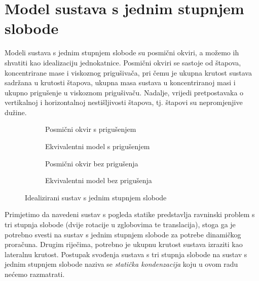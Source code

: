 \section{Model sustava s jednim stupnjem slobode}
Modeli sustava s jednim stupnjem slobode su posmični okviri, a možemo ih shvatiti
kao idealizaciju jednokatnice. Posmični okviri se sastoje od štapova, koncentrirane
mase i viskoznog prigušivača, pri čemu je ukupna krutost sustava sadržana u krutosti
štapova, ukupna masa sustava u koncentriranoj masi i ukupno prigušenje u viskoznom
prigušivaču. Nadalje, vrijedi pretpostavaka o vertikalnoj i horizontalnoj
nestišljivosti štapova, tj. štapovi su nepromjenjive dužine.
\par
\begin{figure}[H]
    \begin{subfigure}[b]{0.5\textwidth}\label{fig:priguseni-sustav-sdf}
        \centering
        
        \caption{Posmični okvir s prigušenjem}
    \end{subfigure}
    \hfill
    \begin{subfigure}[b]{0.5\textwidth}\label{fig:priguseni-ekvivalentni-sustav-sdf}
        \centering
        
        \caption{Ekvivalentni model s prigušenjem}
    \end{subfigure}
    \vfill
    \begin{subfigure}[b]{0.5\textwidth}\label{fig:nepriguseni-sustav-sdf}
        \centering
        
        \caption{Posmični okvir bez prigušenja}
    \end{subfigure}
    \hfill
    \begin{subfigure}[b]{0.5\textwidth}\label{fig:nepriguseni-ekvivalentni-sustav-sdf}
        \centering
        
        \caption{Ekvivalentni model bez prigušenja}
    \end{subfigure}
    \caption{Idealizirani sustav s jednim stupnjem slobode}
\end{figure}

Primjetimo da navedeni sustav s pogleda statike predstavlja ravninski problem s tri
stupnja slobode (dvije rotacije u zglobovima te translacija), stoga ga je potrebno
svesti na sustav s jednim stupnjem slobode za potrebe dinamičkog proračuna. Drugim
riječima, potrebno je ukupnu krutost sustava izraziti kao lateralnu krutost.
Postupak svođenja sustava s tri stupnja slobode na sustav s jednim stupnjem slobode
naziva se \textit{statička kondenzacija} koju u ovom radu nećemo razmatrati.
\newpage

